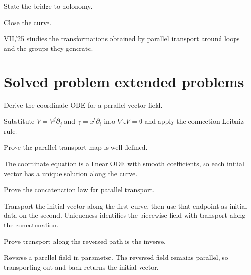 \begin{exercise}\label{exr:vii24-24}
State the bridge to holonomy.
\end{exercise}
\begin{hint}
Close the curve.
\end{hint}
\begin{solution}
VII/25 studies the transformations obtained by parallel transport around loops and the groups they generate.
\end{solution}

\section{Solved problem extended problems}

\begin{problem}\label{prob:vii24-01}
Derive the coordinate ODE for a parallel vector field.
\end{problem}
\begin{solution}
Substitute \(V=V^j\partial_j\) and \(\dot\gamma=\dot x^i\partial_i\) into \(\nabla_{\dot\gamma}V=0\) and apply the connection Leibniz rule.
\end{solution}


\begin{problem}\label{prob:vii24-02}
Prove the parallel transport map is well defined.
\end{problem}
\begin{solution}
The coordinate equation is a linear ODE with smooth coefficients, so each initial vector has a unique solution along the curve.
\end{solution}


\begin{problem}\label{prob:vii24-03}
Prove the concatenation law for parallel transport.
\end{problem}
\begin{solution}
Transport the initial vector along the first curve, then use that endpoint as initial data on the second. Uniqueness identifies the piecewise field with transport along the concatenation.
\end{solution}


\begin{problem}\label{prob:vii24-04}
Prove transport along the reversed path is the inverse.
\end{problem}
\begin{solution}
Reverse a parallel field in parameter. The reversed field remains parallel, so transporting out and back returns the initial vector.
\end{solution}


